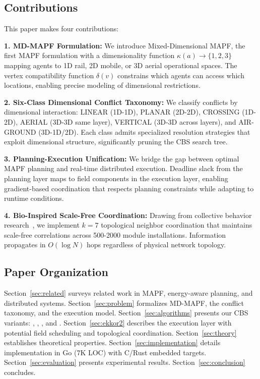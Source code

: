 \subsection{Contributions}

This paper makes four contributions:

\textbf{1. MD-MAPF Formulation:} We introduce Mixed-Dimensional MAPF, the first MAPF formulation with a dimensionality function $\kappa(a) \rightarrow \{1, 2, 3\}$ mapping agents to 1D rail, 2D mobile, or 3D aerial operational spaces. The vertex compatibility function $\delta(v)$ constrains which agents can access which locations, enabling precise modeling of dimensional restrictions.

\textbf{2. Six-Class Dimensional Conflict Taxonomy:} We classify conflicts by dimensional interaction: LINEAR (1D-1D), PLANAR (2D-2D), CROSSING (1D-2D), AERIAL (3D-3D same layer), VERTICAL (3D-3D across layers), and AIR-GROUND (3D-1D/2D). Each class admits specialized resolution strategies that exploit dimensional structure, significantly pruning the CBS search tree.

\textbf{3. Planning-Execution Unification:} We bridge the gap between optimal MAPF planning and real-time distributed execution. Deadline slack from the planning layer maps to field components in the execution layer, enabling gradient-based coordination that respects planning constraints while adapting to runtime conditions.

\textbf{4. Bio-Inspired Scale-Free Coordination:} Drawing from collective behavior research~\cite{cavagna2010scale}, we implement $k=7$ topological neighbor coordination that maintains scale-free correlations across 500-2000 module installations. Information propagates in $O(\log N)$ hops regardless of physical network topology.

\subsection{Paper Organization}

Section~\ref{sec:related} surveys related work in MAPF, energy-aware planning, and distributed systems. Section~\ref{sec:problem} formalizes MD-MAPF, the conflict taxonomy, and the execution model. Section~\ref{sec:algorithms} presents our CBS variants: \mixedcbs{}, \ecbs{}, \deadline{}, and \hybridcbs{}. Section~\ref{sec:ekkor2} describes the \ekkor{} execution layer with potential field scheduling and topological coordination. Section~\ref{sec:theory} establishes theoretical properties. Section~\ref{sec:implementation} details implementation in Go (7K LOC) with C/Rust embedded targets. Section~\ref{sec:evaluation} presents experimental results. Section~\ref{sec:conclusion} concludes.
